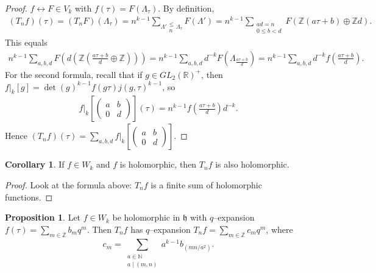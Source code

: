 \documentclass{article}
\theoremstyle{definition}
\newtheorem{cor}[theorem]{Corollary}
\newtheorem{prop}[theorem]{Proposition}
\begin{document}
\begin{proof}
    $f \leftrightarrow F \in V_k$ with $f(\tau) = F(\Lambda_\tau)$. By definition, 
    \begin{align*}
        (T_n f)(\tau) = (T_n F)(\Lambda_\tau) = n^{k-1} \sum_{\Lambda' \substack{\le \\ n}\Lambda_{\tau}}^{} F(\Lambda') = n^{k-1} \sum_{\substack{ad=n \\ 0\le b<d}} F(\mathbb{Z}(a \tau + b)\oplus \mathbb{Z} d).
    \end{align*}
    This equals 
    \begin{align*}
        n^{k-1}\sum_{a,b,d}^{} F(d (\mathbb{Z}(\frac{a \tau + b}{d} \oplus \mathbb{Z}))) = n^{k-1}\sum_{a,b,d}^{} d^{-k}F(\Lambda_{\frac{a \tau + b}{d}}) = n^{k-1} \sum_{a,b,d}^{} d^{-k}f(\frac{a \tau +b}{d}).
    \end{align*}
    For the second formula, recall that if $g \in GL_2(\mathbb{R})^+$, then $f|_k[g] = \det(g)^{k-1}f(g \tau)j(g,\tau)^{k-1}$, so
    \begin{align*}
        f|_k[\begin{pmatrix} a&b\\0&d \end{pmatrix}](\tau) = n^{k-1} f(\frac{a \tau + b}{d})d^{-k}.
    \end{align*}
    Hence $(T_n f)(\tau) = \sum_{a,b,d}^{} f|_k [\begin{pmatrix} a & b \\ 0 &d \end{pmatrix}]$.
\end{proof}
\begin{cor}
    If $f \in W_k$ and $f$ is holomorphic, then $T_n f$ is also holomorphic.
\end{cor}
\begin{proof}
    Look at the formula above: $T_n f$ is a finite sum of holomorphic functions.
\end{proof}
\begin{prop}
    Let $f \in W_k$ be holomorphic in $\mathfrak{h}$ with $q$--expansion $f(\tau) = \sum_{m \in \mathbb{Z}}^{} b_m q^m$. Then $T_n f$ has $q$--expansion $T_n f = \sum_{m \in \mathbb{Z}}^{} c_m q^m$, where $$c_m = \sum_{\substack{a \in \mathbb{N} \\ a \mid (m,n)}}^{} a^{k-1}b_{(mn/a^2)}.$$
\end{prop}
\end{document}
